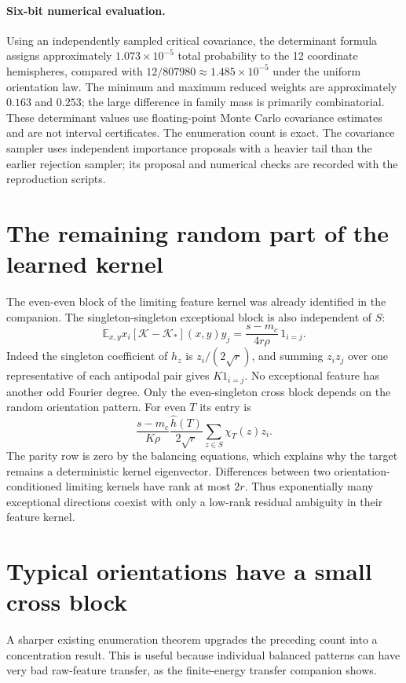 \documentclass[11pt]{article}
\newcommand{\E}{\mathbb E}\newcommand{\R}{\mathbb R}
\begin{document}
\paragraph{Six-bit numerical evaluation.}
Using an independently sampled critical covariance, the determinant
formula assigns approximately $1.073\times10^{-5}$ total probability
to the 12 coordinate hemispheres, compared with $12/807980\approx
1.485\times10^{-5}$ under the uniform orientation law. The minimum and
maximum reduced weights are approximately $0.163$ and $0.253$; the
large difference in family mass is primarily combinatorial.
These determinant values use floating-point Monte Carlo covariance
estimates and are not interval certificates. The enumeration count is
exact. The covariance sampler uses independent importance proposals
with a heavier tail than the earlier rejection sampler; its proposal
and numerical checks are recorded with the reproduction scripts.

\section{The remaining random part of the learned kernel}
The even-even block of the limiting feature kernel was already identified
in the companion. The singleton-singleton exceptional block is also
independent of $S$:
\[
 \E_{x,y}x_i[\mathcal K-\mathcal K_*](x,y)y_j
       =\frac{s-m_c}{4r\rho}\,1_{i=j}.
\]
Indeed the singleton coefficient of $h_z$ is $z_i/(2\sqrt r)$,
and summing $z_i z_j$ over one representative of each antipodal pair
gives $K1_{i=j}$. No exceptional feature has another odd Fourier degree.
Only the even-singleton cross block depends on the random orientation
pattern. For even $T$ its entry is
\[
 \frac{s-m_c}{K\rho}\frac{\widehat h(T)}{2\sqrt r}
       \sum_{z\in S}\chi_T(z)z_i.
\]
The parity row is zero by the balancing equations, which explains why
the target remains a deterministic kernel eigenvector. Differences
between two orientation-conditioned limiting kernels have rank at most
$2r$. Thus exponentially many exceptional directions coexist with only
a low-rank residual ambiguity in their feature kernel.

\section{Typical orientations have a small cross block}
A sharper existing enumeration theorem upgrades the preceding count into
a concentration result. This is useful because individual balanced
patterns can have very bad raw-feature transfer, as the finite-energy
transfer companion shows.
\end{document}
